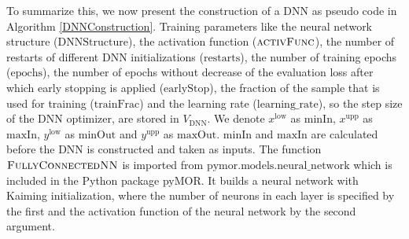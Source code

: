 To summarize this, we now present the construction of a DNN as pseudo code in Algorithm \ref{DNNConstruction}. Training parameters like the neural network structure ($\mathrm{DNNStructure}$), the activation function ($\textproc{activFunc}$), the number of restarts of different DNN initializations ($\mathrm{restarts}$), the number of training epochs ($\mathrm{epochs}$), the number of epochs without decrease of the evaluation loss after which early stopping is applied ($\mathrm{earlyStop}$), the fraction of the sample that is used for training ($\mathrm{trainFrac}$) and the learning rate ($\mathrm{learning\_rate}$), so the step size of the DNN optimizer, are stored in $V_\mathrm{DNN}$. We denote $x^\mathrm{low}$ as $\mathrm{minIn}$, $x^\mathrm{upp}$ as $\mathrm{maxIn}$, $y^\mathrm{low}$ as $\mathrm{minOut}$ and $y^\mathrm{upp}$ as $\mathrm{maxOut}$. $\mathrm{minIn}$ and $\mathrm{maxIn}$ are calculated before the DNN is constructed and taken as inputs. The function $\textproc{FullyConnectedNN}$ is imported from $\mathrm{pymor.models.neural\_network}$ which is included in the Python package pyMOR. It builds a neural network with Kaiming initialization, where the number of neurons in each layer is specified by the first and the activation function of the neural network by the second argument.

